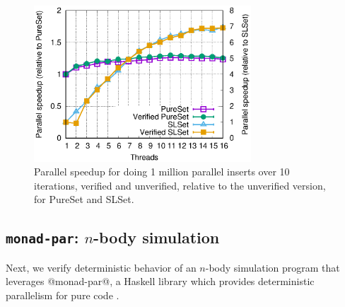
\begin{figure}
  \begin{center}
    \includegraphics[width=3.2in]{text/refinementreflection/set.eps}
  \end{center}
  \caption{Parallel speedup for doing 1 million parallel inserts over 10
    iterations, verified and unverified, relative to the unverified version,
    for PureSet and SLSet.}
  \label{fig:set}
\end{figure}

\subsection{\texttt{monad-par}: $n$-body simulation}
\label{sec:nbody}
Next, we verify deterministic behavior of an
$n$-body simulation program that leverages @monad-par@, a Haskell library which
provides deterministic parallelism for pure code \cite{monad-par}.

